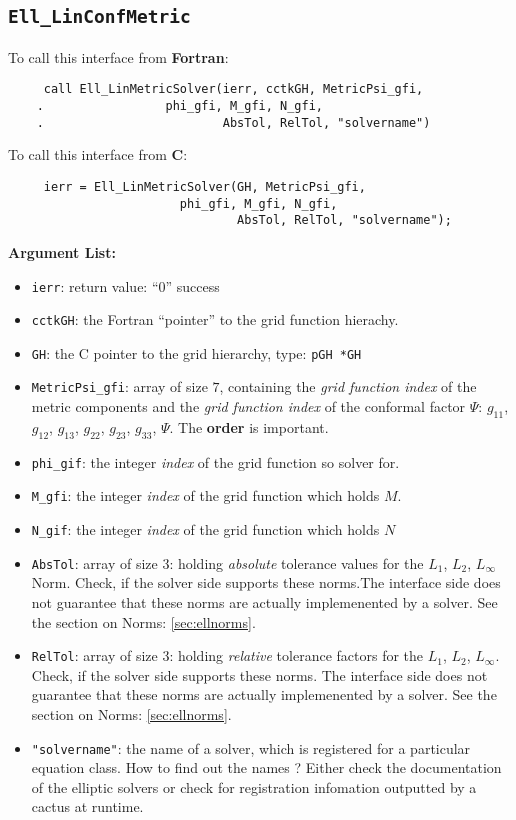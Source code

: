 \documentclass{article}
\begin{document}
\subsection{{\tt Ell\_LinConfMetric}}
To call this interface from {\bf Fortran}:
\begin{verbatim}
	 call Ell_LinMetricSolver(ierr, cctkGH, MetricPsi_gfi, 
	.	 	          phi_gfi, M_gfi, N_gfi,
	.                         AbsTol, RelTol, "solvername") 
\end{verbatim}
To call this interface from {\bf C}:
\begin{verbatim}
	 ierr = Ell_LinMetricSolver(GH, MetricPsi_gfi, 
		 	            phi_gfi, M_gfi, N_gfi,
	                            AbsTol, RelTol, "solvername");
\end{verbatim}
{\bf Argument List:}
\begin{itemize}
\item{\tt ierr}: return value: ``0'' success
\item{\tt cctkGH}: the Fortran ``pointer'' to the grid function
hierachy.
\item{\tt GH}: the C pointer to the grid hierarchy, type: {\tt pGH
*GH}
\item{\tt MetricPsi\_gfi}: array of size $7$, containing the {\em
grid function index} of the metric components and the {\em grid
function index} of the conformal factor $\Psi$: $g_{11}$, 
$g_{12}$, $g_{13}$, $g_{22}$, $g_{23}$, $g_{33}$, $\Psi$. The {\bf order} is important.
\item{\tt phi\_gif}: the integer {\em index} of the grid function so solver
for.
\item{\tt M\_gfi}:  the integer {\em index} of the grid function which holds
$M$.
\item{\tt N\_gif}: the integer {\em index} of the grid function which holds $N$
\item{\tt AbsTol}: array of size $3$: holding {\em absolute} tolerance values for the 
$L_1$, $L_2$, $L_\infty$ Norm.  Check, if the solver side supports
these norms.The interface side does not guarantee that these norms are 
actually implemenented by a solver. See the section on Norms: \ref{sec:ellnorms}.
\item{\tt RelTol}: array of size $3$: holding {\em relative}
tolerance factors for the $L_1$, $L_2$, $L_\infty$. Check, if the 
solver side supports these norms. The interface side does not
guarantee that these norms are actually implemenented by a solver. 
See the section on Norms: \ref{sec:ellnorms}.
\item{\tt  "solvername"}: the name of a solver, which is registered
for a particular equation class. How to find out the names ? Either
check the documentation of the elliptic solvers or check for
registration infomation outputted by a cactus at runtime.

\end{itemize}
\end{document}
